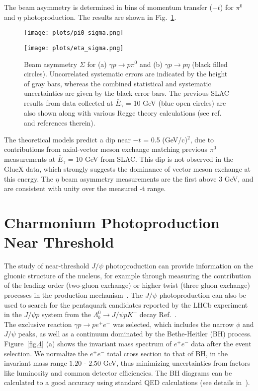 \documentclass[a4paper]{jpconf}
\begin{document}
\noindent The beam asymmetry is determined in bins of momentum transfer ($-t$) for $\pi^{0}$ and $\eta$ photoproduction. The results are shown in Fig.~\ref{fig.3}.

\begin{figure}[h]
    \centering
    \begin{minipage}{16pc}
        \texttt{[image: plots/pi0\_sigma.png]}
    \end{minipage}\hspace{3pc}%
    \begin{minipage}{16pc}
        \texttt{[image: plots/eta\_sigma.png]}
    \end{minipage}
    \caption{\label{fig.3} Beam asymmetry $\Sigma$ for (a) $\gamma p \rightarrow p \pi^{0}$ and (b) $\gamma p \rightarrow p \eta$ (black filled circles). Uncorrelated systematic errors are indicated by the height of gray bars, whereas the combined statistical and systematic uncertainties are given by the black error bars. The previous SLAC results from data collected at $\overline{{E}}_{\gamma}$ = 10 GeV (blue open circles) are also shown along with various Regge theory calculations (see ref.~\cite{ref.4} and references therein).}
\end{figure}

The theoretical models predict a dip near $-t$ = 0.5 (GeV/c)$^{2}$, due to contributions from axial-vector meson exchange matching previous $\pi^{0}$ measurements at $\overline{E}_{\gamma}$ = 10 GeV from SLAC. This dip is not observed in the GlueX data, which strongly suggests the dominance of vector meson exchange at this energy. The $\eta$ beam asymmetry measurements are the first above 3 GeV, and are consistent with unity over the measured -t range.

\section{Charmonium Photoproduction Near Threshold}
The study of near-threshold $J/\psi$ photoproduction can provide information on the gluonic structure of the nucleus, for example through measuring the contribution of the leading order (two-gluon exchange) or higher twist (three gluon exchange) processes in the production mechanism~\cite{ref.5}. The $J/\psi$ photoproduction can also be used to search for the pentaquark candidates reported by the LHCb experiment in the $J/\psi p$ system from the $\Lambda^{0}_{b} \rightarrow J/\psi p K^{-}$ decay Ref.~\cite{ref.5}.\\
The exclusive reaction $\gamma p \rightarrow p e^{+}e^{-}$ was selected, which includes the narrow $\phi$ and $J/\psi$ peaks, as well as a continuum dominated by the Bethe-Heitler (BH) process. Figure~\ref{fig.4} (a) shows the invariant mass spectrum of $e^{+}e^{-}$ data after the event selection. We normalize the $e^{+}e^{-}$ total cross section to that of BH, in the invariant mass range $1.20$ - $2.50$ GeV, thus minimizing uncertainties from factors like luminosity and common detector efficiencies. The BH diagrams can be calculated to a good accuracy using standard QED calculations (see details in~\cite{ref.5}).
\end{document}
